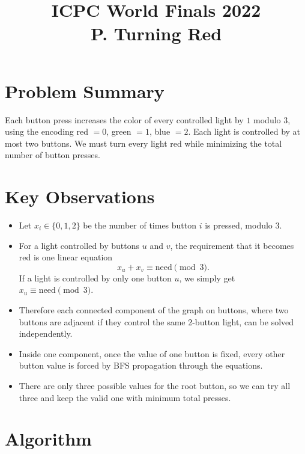 \documentclass[11pt]{article}
\title{ICPC World Finals 2022\\P. Turning Red}
\author{}
\date{}
\begin{document}
\maketitle

\section*{Problem Summary}

Each button press increases the color of every controlled light by $1$ modulo $3$, using the encoding
red $=0$, green $=1$, blue $=2$. Each light is controlled by at most two buttons. We must turn every
light red while minimizing the total number of button presses.

\section*{Key Observations}

\begin{itemize}[leftmargin=*]
    \item Let $x_i \in \{0,1,2\}$ be the number of times button $i$ is pressed, modulo $3$.
    \item For a light controlled by buttons $u$ and $v$, the requirement that it becomes red is one linear
    equation
    \[
    x_u+x_v \equiv \text{need} \pmod 3.
    \]
    If a light is controlled by only one button $u$, we simply get $x_u \equiv \text{need} \pmod 3$.
    \item Therefore each connected component of the graph on buttons, where two buttons are adjacent if
    they control the same 2-button light, can be solved independently.
    \item Inside one component, once the value of one button is fixed, every other button value is forced by
    BFS propagation through the equations.
    \item There are only three possible values for the root button, so we can try all three and keep the valid
    one with minimum total presses.
\end{itemize}

\section*{Algorithm}
\end{document}
